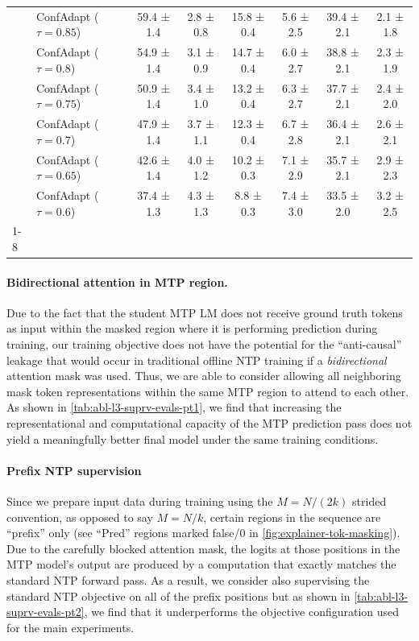 \documentclass{article}
\theoremstyle{plain}
\theoremstyle{definition}
\theoremstyle{remark}
\begin{document}
\begin{table}[h!]
\begin{tabular}{llcccccc}
 & ConfAdapt ($\tau=0.85$) & 59.4 ± 1.4 & 2.8 ± 0.8 & 15.8 ± 0.4 & 5.6 ± 2.5 & 39.4 ± 2.1 & 2.1 ± 1.8 \\
 & ConfAdapt ($\tau=0.8$) & 54.9 ± 1.4 & 3.1 ± 0.9 & 14.7 ± 0.4 & 6.0 ± 2.7 & 38.8 ± 2.1 & 2.3 ± 1.9 \\
 & ConfAdapt ($\tau=0.75$) & 50.9 ± 1.4 & 3.4 ± 1.0 & 13.2 ± 0.4 & 6.3 ± 2.7 & 37.7 ± 2.1 & 2.4 ± 2.0 \\
 & ConfAdapt ($\tau=0.7$) & 47.9 ± 1.4 & 3.7 ± 1.1 & 12.3 ± 0.4 & 6.7 ± 2.8 & 36.4 ± 2.1 & 2.6 ± 2.1 \\
 & ConfAdapt ($\tau=0.65$) & 42.6 ± 1.4 & 4.0 ± 1.2 & 10.2 ± 0.3 & 7.1 ± 2.9 & 35.7 ± 2.1 & 2.9 ± 2.3 \\
 & ConfAdapt ($\tau=0.6$) & 37.4 ± 1.3 & 4.3 ± 1.3 & 8.8 ± 0.3 & 7.4 ± 3.0 & 33.5 ± 2.0 & 3.2 ± 2.5 \\
\cline{1-8}
\bottomrule
\end{tabular}
\end{table}


\clearpage

\paragraph{Bidirectional attention in MTP region.}

Due to the fact that the student MTP LM does not receive ground truth tokens as input within the masked region where it is performing prediction during training, our training objective does not have the potential for the ``anti-causal'' leakage that would occur in traditional offline NTP training if a \textit{bidirectional} attention mask was used. Thus, we are able to consider allowing all neighboring mask token representations within the same MTP region to attend to each other. As shown in \cref{tab:abl-l3-suprv-evals-pt1}, we find that increasing the representational and computational capacity of the MTP prediction pass does not yield a meaningfully better final model under the same training conditions.

\paragraph{Prefix NTP supervision}

Since we prepare input data during training using the $M=N/(2k)$ strided convention, as opposed to say $M=N/k$, certain regions in the sequence are ``prefix'' only (see ``Pred'' regions marked false/0 in \cref{fig:explainer-tok-masking}). Due to the carefully blocked attention mask, the logits at those positions in the MTP model's output are produced by a computation that exactly matches the standard NTP forward pass. As a result, we consider also supervising the standard NTP objective on all of the prefix positions but as shown in \cref{tab:abl-l3-suprv-evals-pt2}, we find that it underperforms the objective configuration used for the main experiments.
\end{document}
